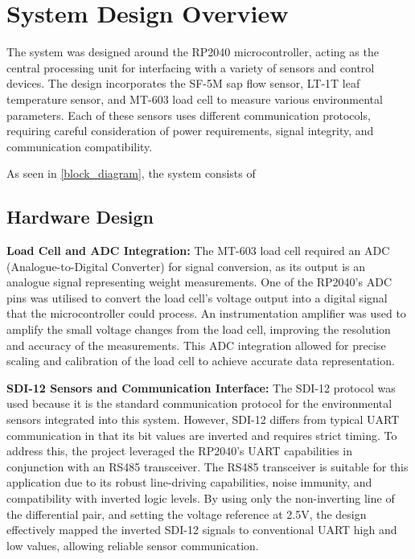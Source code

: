 
\section{System Design Overview}

The system was designed around the RP2040 microcontroller, acting as the central 
processing unit for interfacing with a variety of sensors and control devices. 
The design incorporates the SF-5M sap flow sensor, LT-1T leaf temperature sensor, 
and MT-603 load cell to measure various environmental parameters. Each of these 
sensors uses different communication protocols, requiring careful consideration of 
power requirements, signal integrity, and communication compatibility.

As seen in \cref{block_diagram}, the system consists of 

\subsection{Hardware Design}
\textbf{Load Cell and ADC Integration:} The MT-603 load cell required an ADC (Analogue-to-Digital Converter) for signal conversion, as its output is an analogue signal representing weight measurements. One of the RP2040's ADC pins was utilised to convert the load cell's voltage output into a digital signal that the microcontroller could process. An instrumentation amplifier was used to amplify the small voltage changes from the load cell, improving the resolution and accuracy of the measurements. This ADC integration allowed for precise scaling and calibration of the load cell to achieve accurate data representation.

\textbf{SDI-12 Sensors and Communication Interface:} The SDI-12 protocol was used because it is the standard communication protocol for the environmental sensors integrated into this system. However, SDI-12 differs from typical UART communication in that its bit values are inverted and requires strict timing. To address this, the project leveraged the RP2040's UART capabilities in conjunction with an RS485 transceiver. The RS485 transceiver is suitable for this application due to its robust line-driving capabilities, noise immunity, and compatibility with inverted logic levels. By using only the non-inverting line of the differential pair, and setting the voltage reference at 2.5V, the design effectively mapped the inverted SDI-12 signals to conventional UART high and low values, allowing reliable sensor communication.

